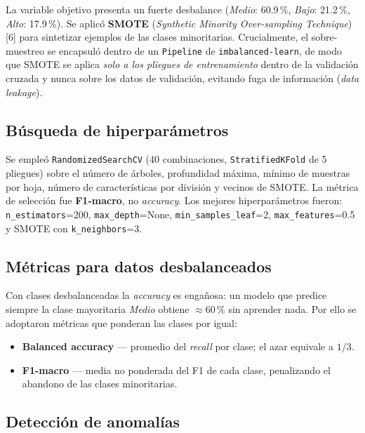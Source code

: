 \documentclass[11pt,twocolumn]{article}
\begin{document}
La variable objetivo presenta un fuerte desbalance (\textit{Medio}:
60.9\,\%, \textit{Bajo}: 21.2\,\%, \textit{Alto}: 17.9\,\%). Se aplic\'o
\textbf{SMOTE} (\textit{Synthetic Minority Over-sampling Technique})
[6] para sintetizar ejemplos de las clases minoritarias.
Crucialmente, el sobre-muestreo se encapsul\'o dentro de un
\texttt{Pipeline} de \texttt{imbalanced-learn}, de modo que SMOTE se
aplica \emph{solo a los pliegues de entrenamiento} dentro de la
validaci\'on cruzada y nunca sobre los datos de validaci\'on, evitando
fuga de informaci\'on (\textit{data leakage}).

\subsection{B\'usqueda de hiperpar\'ametros}

Se emple\'o \texttt{RandomizedSearchCV} (40 combinaciones,
\texttt{StratifiedKFold} de 5 pliegues) sobre el n\'umero de \'arboles,
profundidad m\'axima, m\'inimo de muestras por hoja, n\'umero de
caracter\'isticas por divisi\'on y vecinos de SMOTE. La m\'etrica de
selecci\'on fue \textbf{F1-macro}, no \textit{accuracy}. Los
mejores hiperpar\'ametros fueron: \texttt{n\_estimators}=200,
\texttt{max\_depth}=None, \texttt{min\_samples\_leaf}=2,
\texttt{max\_features}=0.5 y SMOTE con \texttt{k\_neighbors}=3.

\subsection{M\'etricas para datos desbalanceados}

Con clases desbalanceadas la \textit{accuracy} es enga\~nosa: un modelo
que predice siempre la clase mayoritaria \textit{Medio} obtiene
$\approx$60\,\% sin aprender nada. Por ello se adoptaron m\'etricas que
ponderan las clases por igual:

\begin{itemize}[leftmargin=12pt, itemsep=0pt, parsep=2pt]
  \item \textbf{Balanced accuracy} --- promedio del \textit{recall} por
        clase; el azar equivale a $1/3$.
  \item \textbf{F1-macro} --- media no ponderada del F1 de cada clase,
        penalizando el abandono de las clases minoritarias.
\end{itemize}

\subsection{Detecci\'on de anomal\'ias}
\end{document}
